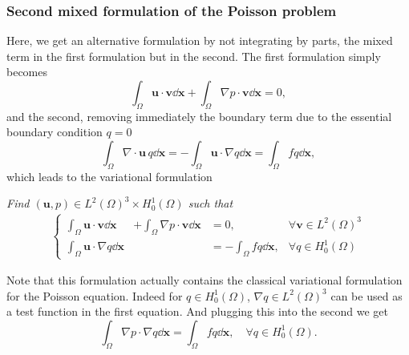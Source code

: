 \subsubsection*{Second mixed formulation of the Poisson problem}
Here, we get an alternative formulation by not integrating by parts, the mixed term in the first formulation but in the second. The first formulation simply becomes
$$\int_{\Omega} \mathbf{u}\cdot \mathbf{v}\dd \mathbf{x} +\int_{\Omega} \nabla p \cdot \mathbf{v}\dd \mathbf{x}=0,$$
and the second, removing immediately the boundary term due to the essential boundary condition $q=0$
$$\int_{\Omega}\nabla \cdot\mathbf{u}  \, q \dd \mathbf{x} =
 -\int_{\Omega}  \mathbf{u} \cdot \nabla q  \dd \mathbf{x} =
\int_{\Omega} f q \dd \mathbf{x},$$
which leads to the variational formulation
\begin{tcolorbox}
  {\em Find $(\mathbf{u},p) \in L^2(\Omega)^3 \times H^1_0(\Omega)$ such that}
  \begin{align}
    \left\{ 
    \begin{array}{llll}
      \int_{\Omega} \mathbf{u}\cdot \mathbf{v}\dd \mathbf{x} &+ \int_{\Omega} \nabla p \cdot \mathbf{v}\dd \mathbf{x} &=0, & \forall \mathbf{v}\in L^2(\Omega)^3 \\
      \int_{\Omega}  \mathbf{u} \cdot \nabla q  \dd \mathbf{x} & & = -\int_{\Omega} f q \dd \mathbf{x}, & \forall q\in H^1_0(\Omega)
    \end{array} \right.
    \label{eq:abs_var_mixed_poisson_2}
  \end{align}
\end{tcolorbox}
Note that this formulation actually contains the classical variational formulation for the Poisson equation. Indeed for $q\in H^1_0(\Omega)$, $\nabla q \in L^2(\Omega)^3$ can be used as a test function in the first equation. And plugging this into the second we get
$$\int_{\Omega}  \nabla p \cdot \nabla q  \dd \mathbf{x}  = \int_{\Omega} f q \dd \mathbf{x}, \quad \forall q\in H^1_0(\Omega).$$



